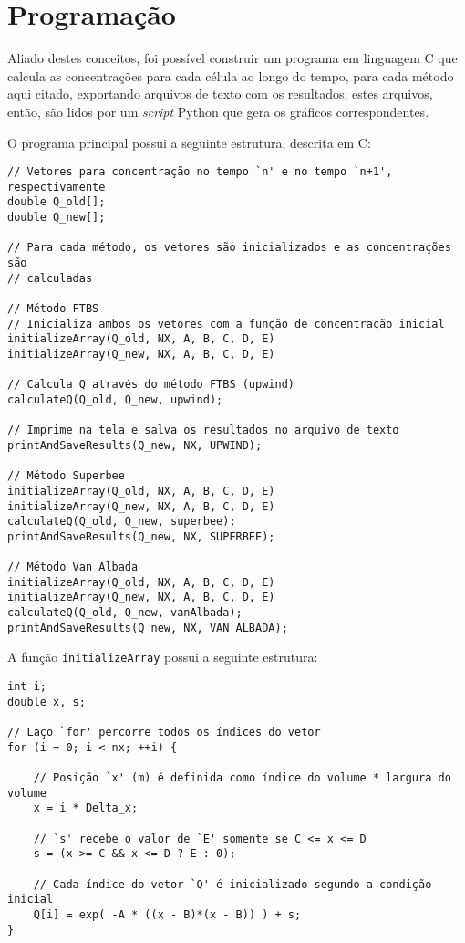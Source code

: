 \section{Programação}
Aliado destes conceitos, foi possível construir um programa em linguagem C que
calcula as concentrações para cada célula ao longo do tempo, para cada método
aqui citado, exportando arquivos de texto com os resultados; estes arquivos,
então, são lidos por um \textit{script} Python que gera os gráficos
correspondentes.

O programa principal possui a seguinte estrutura, descrita em C:

\begin{Verbatim}[fontsize=\footnotesize]
// Vetores para concentração no tempo `n' e no tempo `n+1', respectivamente
double Q_old[];
double Q_new[];

// Para cada método, os vetores são inicializados e as concentrações são
// calculadas

// Método FTBS
// Inicializa ambos os vetores com a função de concentração inicial
initializeArray(Q_old, NX, A, B, C, D, E)
initializeArray(Q_new, NX, A, B, C, D, E)

// Calcula Q através do método FTBS (upwind)
calculateQ(Q_old, Q_new, upwind);

// Imprime na tela e salva os resultados no arquivo de texto
printAndSaveResults(Q_new, NX, UPWIND);

// Método Superbee
initializeArray(Q_old, NX, A, B, C, D, E)
initializeArray(Q_new, NX, A, B, C, D, E)
calculateQ(Q_old, Q_new, superbee);
printAndSaveResults(Q_new, NX, SUPERBEE);

// Método Van Albada
initializeArray(Q_old, NX, A, B, C, D, E)
initializeArray(Q_new, NX, A, B, C, D, E)
calculateQ(Q_old, Q_new, vanAlbada);
printAndSaveResults(Q_new, NX, VAN_ALBADA);
\end{Verbatim}

\noindent A função \verb|initializeArray| possui a seguinte estrutura:
\begin{Verbatim}[fontsize=\footnotesize]
int i;
double x, s;

// Laço `for' percorre todos os índices do vetor
for (i = 0; i < nx; ++i) {

    // Posição `x' (m) é definida como índice do volume * largura do volume
    x = i * Delta_x;

    // `s' recebe o valor de `E' somente se C <= x <= D
    s = (x >= C && x <= D ? E : 0);

    // Cada índice do vetor `Q' é inicializado segundo a condição inicial
    Q[i] = exp( -A * ((x - B)*(x - B)) ) + s;
}
\end{Verbatim}

